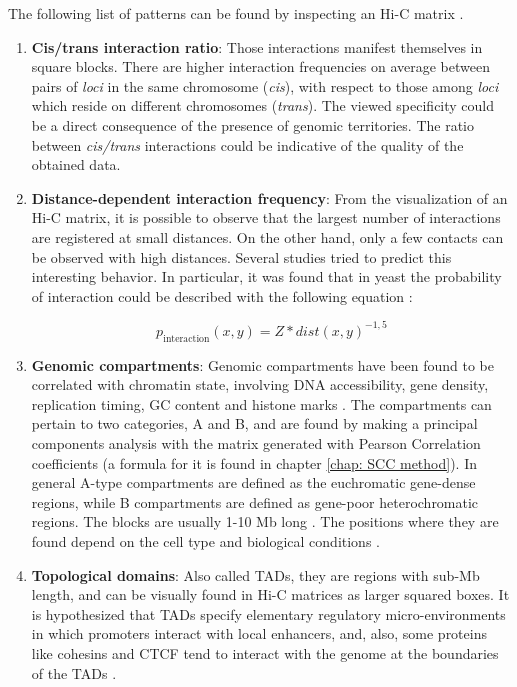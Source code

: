The following list of patterns can be found by inspecting an Hi-C matrix
\cite{distefanoHiCconstrainedPhysicalModels2016,lajoieHitchhikerGuideHiC2015}.

\begin{enumerate}
    \item \textbf{Cis/trans interaction ratio}: Those interactions manifest themselves in square blocks. There are higher interaction frequencies on average between pairs of \textit{loci} in the same chromosome (\textit{cis}), with respect to those among \textit{loci} which reside on different chromosomes (\textit{trans}). The viewed specificity could be a direct consequence of the presence of genomic territories. The ratio between \textit{cis/trans} interactions could be indicative of the quality of the obtained data.
    
    \item \textbf{Distance-dependent interaction frequency}: From the visualization of an Hi-C matrix, it is possible to observe that the largest number of interactions are registered at small distances. On the other hand, only a few contacts can be observed with high distances. Several studies tried to predict this interesting behavior. In particular, it was found that in yeast the probability of interaction could be described with the following equation
    \cite{lajoieHitchhikerGuideHiC2015}:
    
    $$
        p_{\text{interaction}}(x,y) = Z * dist(x,y)^{-1,5}
    $$
    
    \item \textbf{Genomic compartments}: Genomic compartments have been found to be correlated with chromatin state, involving DNA accessibility, gene density, replication timing, GC content and histone marks
    \cite{lieberman-aidenComprehensiveMappingLong2009}. 
    The compartments can pertain to two categories, A and B, and are found by making a principal components analysis with the matrix generated with Pearson Correlation coefficients (a formula for it is found in chapter \ref{chap: SCC method}). In general A-type compartments are defined as the euchromatic gene-dense regions, while B compartments are defined as gene-poor heterochromatic regions. The blocks are usually 1-10 Mb long
    \cite{lajoieHitchhikerGuideHiC2015}.
    The positions where they are found depend on the cell type and biological conditions
    \cite{lajoieHitchhikerGuideHiC2015}.
    
    \item \textbf{Topological domains}: Also called TADs, they are regions with sub-Mb length, and can be visually found in Hi-C matrices as larger squared boxes. It is hypothesized that TADs specify elementary regulatory micro-environments in which promoters interact with local enhancers, and, also, some proteins like cohesins and CTCF tend to interact with the genome at the boundaries of the TADs
    \cite{lajoieHitchhikerGuideHiC2015}.
    

\end{enumerate}
